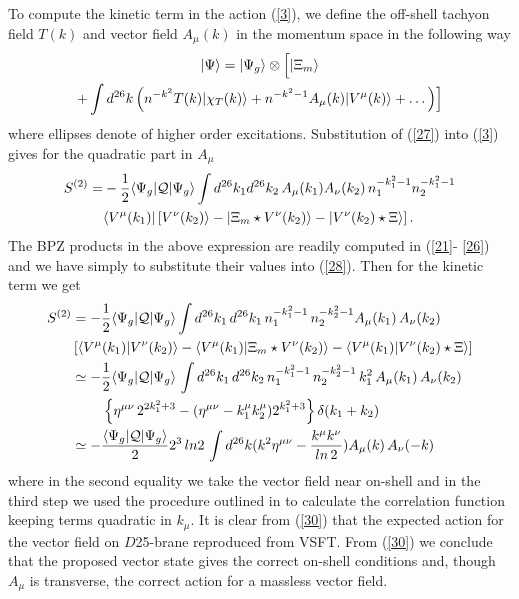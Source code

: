 \documentclass[a4paper,12pt]{article}
\begin{document}
To compute the kinetic term in the action (\ref{3}), we define the off-shell
tachyon field $T(k)$ and vector field $A_\mu(k)$ in the momentum space
in the following way
\begin{multline}
|\Psi\rangle=|\Psi_g\rangle\otimes\Bigl[
|\Xi_m\rangle \\
+\int d^{26}k\left(
n^{-k^2}T(k)|\chi_T(k)\rangle +n^{-k^2-1}A_\mu(k)|V^\mu(k)\rangle 
+\dots \right)\Bigr]
\label{27}
\end{multline}
where ellipses denote of higher order excitations. Substitution of
(\ref{27}) into (\ref{3}) gives for the quadratic part in $A_\mu$ 
\begin{align}
S^{(2)}=&-\frac 12\langle\Psi_g|\mathcal{Q}|\Psi_g\rangle
\int d^{26}k_1d^{26}k_2\, A_\mu(k_1)A_\nu(k_2)\, n_1^{-k_1^2-1}
n_2^{-k_1^2-1}
\notag \\
&\langle V^\mu(k_1)|\left[V^\nu(k_2)\rangle -
|\Xi_m\star V^\nu(k_2)\rangle -|V^\nu(k_2)\star\Xi\rangle
\right].
\label{28}
\end{align}
The BPZ products in the above expression are readily computed in (\ref{21}-
\ref{26}) and we have simply to substitute their values into (\ref{28}).
Then for the kinetic term we get
\begin{align}
S^{(2)}&=-\frac 12\langle\Psi_g|
\mathcal{Q}|\Psi_g\rangle \int d^{26}k_1\,d^{26}k_1\,
n_1^{-k_1^2-1}\,n_2^{-k_2^2-1} A_\mu(k_1)\, A_\nu(k_2)
\notag \\
&\left[
\langle V^\mu(k_1)|V^\nu(k_2)\rangle -
\langle V^\mu(k_1)|\Xi_m\star V^\nu(k_2)\rangle -
\langle V^\mu(k_1)|V^\nu(k_2)\star\Xi\rangle
\right]
\notag \\
& \simeq
-\frac 12\langle\Psi_g|
\mathcal{Q}|\Psi_g\rangle\,\int d^{26}k_1\,d^{26}k_2\, 
n_1^{-k_1^2-1}\,n_2^{-k_2^2-1}\, k_1^2 \, A_\mu(k_1)\, A_\nu(k_2) \notag 
\\
&
\qquad \, \left\{ \eta^{\mu\nu}\, 2^{2k_1^2+3} -(\eta^{\mu\nu} -k_1^\mu 
k_2^\mu)2^{k_1^2+3}\right\}\delta(k_1+k_2) \notag \\
& \simeq
-\frac{\langle\Psi_g|
\mathcal{Q}|\Psi_g\rangle}{2}2^3\,ln2\,\int d^{26}k
(k^2\eta^{\mu\nu}-\frac{k^\mu k^\nu}{ln\,2}) 
A_\mu(k)\, A_\nu(-k)
\label{30}
\end{align}
where in the second equality we take the vector field near on-shell and
in the third step we used the procedure outlined in \cite{rv} to
calculate the correlation function keeping terms quadratic in $k_\mu$.
It is clear from (\ref{30}) that the expected 
action for the vector field on $D$25-brane reproduced from VSFT.
From (\ref{30}) we conclude that the proposed vector state gives the correct
on-shell conditions and, though $A_\mu$ is transverse, the correct action for 
a massless vector field.
\end{document}
